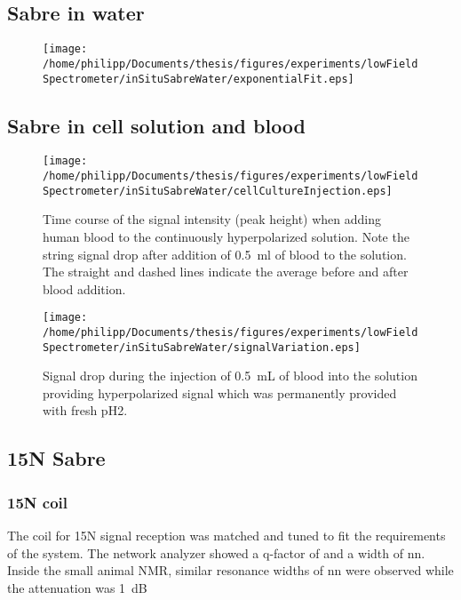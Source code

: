     \subsection{Sabre in water}
    \begin{figure}
    \end{figure}
    \begin{figure}
        \centering
        \texttt{[image: /home/philipp/Documents/thesis/figures/experiments/lowFieldSpectrometer/inSituSabreWater/exponentialFit.eps]}
    \end{figure}
    \subsection{Sabre in cell solution and blood}
    \begin{figure}
        \texttt{[image: /home/philipp/Documents/thesis/figures/experiments/lowFieldSpectrometer/inSituSabreWater/cellCultureInjection.eps]}
        \caption[Cell culture solution addition to hyperpolarized signal]{Time course of the signal intensity (peak height) when adding human blood to the continuously hyperpolarized solution. Note the string signal drop after addition of \SI{0.5}{\milli\litre} of blood to the solution. The straight and dashed lines indicate the average before and after blood addition.}
        \label{chap:MaterialsAndMethods:bloodInjection}
    \end{figure}
    \begin{figure}
        \texttt{[image: /home/philipp/Documents/thesis/figures/experiments/lowFieldSpectrometer/inSituSabreWater/signalVariation.eps]}
        \label{chap:MaterialsAndMethods:bloodInjection2}
        \caption[Blood addition to hyperpolarized signal]{Signal drop during the injection of \SI{0.5}{\milli\liter} of blood into the solution providing hyperpolarized signal which was permanently provided with fresh pH2.}
    \end{figure}
    \subsection{15N Sabre}
        \subsubsection{15N coil}
        The coil for 15N signal reception was matched and tuned to fit the requirements of the system. The network analyzer showed a q-factor of  and a width of nn. Inside the small animal NMR, similar resonance widths of nn were observed while the attenuation was \SI{1}{\deci\bel}
